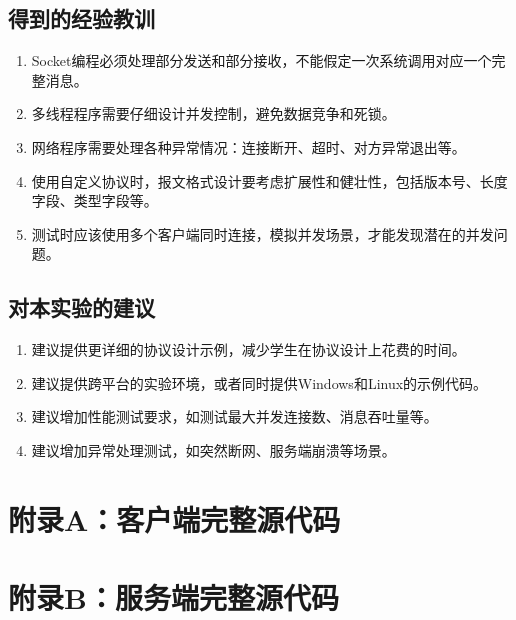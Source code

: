 \documentclass[12pt,a4paper]{article}
\begin{document}
\subsection{得到的经验教训}

\begin{enumerate}
    \item Socket编程必须处理部分发送和部分接收，不能假定一次系统调用对应一个完整消息。
    \item 多线程程序需要仔细设计并发控制，避免数据竞争和死锁。
    \item 网络程序需要处理各种异常情况：连接断开、超时、对方异常退出等。
    \item 使用自定义协议时，报文格式设计要考虑扩展性和健壮性，包括版本号、长度字段、类型字段等。
    \item 测试时应该使用多个客户端同时连接，模拟并发场景，才能发现潜在的并发问题。
\end{enumerate}

\subsection{对本实验的建议}

\begin{enumerate}
    \item 建议提供更详细的协议设计示例，减少学生在协议设计上花费的时间。
    \item 建议提供跨平台的实验环境，或者同时提供Windows和Linux的示例代码。
    \item 建议增加性能测试要求，如测试最大并发连接数、消息吞吐量等。
    \item 建议增加异常处理测试，如突然断网、服务端崩溃等场景。
\end{enumerate}

\newpage

\appendix

\section{附录A：客户端完整源代码}



\newpage

\section{附录B：服务端完整源代码}


\end{document}
